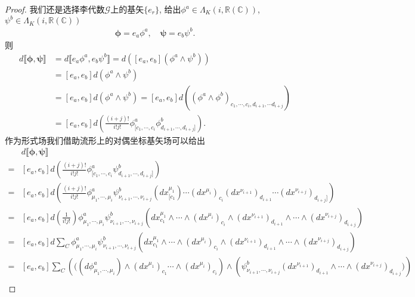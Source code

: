 \documentclass[../main.tex]{subfiles}
\begin{document}
\begin{proof}
  我们还是选择李代数$\mathscr{G}$上的基矢$\{e_r\}$, 给出$\phi^a \in \Lambda_K(i,\mathbb{R}(\mathbb{C}))$,$\psi^b \in \Lambda_K(i,\mathbb{R}(\mathbb{C}) )$
  \begin{align*}
    \bm{\phi} = e_a \phi^a ,\quad \bm{\psi} = e_b \psi^b 
  .\end{align*}
  则
  \begin{align*}
    d \llbracket \bm{\phi} ,\bm{\psi}  \rrbracket &= d \llbracket e_a \phi^a,e_b \psi^b \rrbracket = d([e_a,e_b](\phi^a \wedge \psi^b)) \\
                                                  & = [e_a,e_b] d(\phi^a \wedge \psi^b)\\
                                                  & = [e_a,e_b] d(\phi^a \wedge \psi^b) = [e_a,e_b]d((\phi^a \wedge \phi^b)_{c_1,\cdots,c_i,d_{i+1},\cdots d_{i+j}})\\
                                                  & = [e_a,e_b] d( \frac{(i+j)!}{i!j!}\phi^a_{[c_1,\cdots,c_i}\phi^b_{d_{i+1},\cdots,d_{i+j}]})
  .\end{align*}
  作为形式场我们借助流形上的对偶坐标基矢场可以给出
  \begin{align*}
    & d \llbracket \bm{\phi} ,\bm{\psi}  \rrbracket\\ =&  [e_a,e_b] d( \frac{(i+j)!}{i!j!}\phi^a_{[c_1,\cdots,c_i}\psi^b_{d_{i+1},\cdots,d_{i+j}]})\\
                                                  =&  [e_a,e_b] d( \frac{(i+j)!}{i!j!}\phi^a_{\mu_1,\cdots,\mu_i}\psi^b_{\nu_{i+1},\cdots,\nu_{i+j}}(dx^{\mu_1}_{[c_1})\cdots (dx^{\mu_i})_{c_i}(dx^{\nu_{i+1}})_{d_{i+1}}\cdots(dx^{\nu_{i+j}})_{d_{i+j}]})\\
                                                  =& [e_a,e_b] d(\frac{1}{i!j!})\phi^a_{\mu_1,\cdots,\mu_i}\psi^b_{\nu_{i+1},\cdots,\nu_{i+j}} (dx^{\mu_1}_{c_1} \wedge \cdots \wedge (dx^{\mu_i})_{c_i}\wedge(dx^{\nu_{i+1}})_{d_{i+1}}\wedge\cdots\wedge(dx^{\nu_{i+j}})_{d_{i+j}})\\
                                                  =& [e_a,e_b] d\sum_{C}\phi^a_{\mu_1,\cdots,\mu_i}\psi^b_{\nu_{i+1},\cdots,\nu_{i+j}} (dx^{\mu_1}_{c_1} \wedge \cdots \wedge (dx^{\mu_i})_{c_i}\wedge(dx^{\nu_{i+1}})_{d_{i+1}}\wedge\cdots\wedge(dx^{\nu_{i+j}})_{d_{i+j}})\\
                                                  = & [e_a,e_b]\sum_{C}\left(((d\phi^a_{\mu_1,\cdots,\mu_i})\wedge(dx^{\mu_1})_{c_1}\cdots\wedge(dx^{\mu_i})_{c_i}\right)\wedge\left(\psi^b_{\nu_{i+1},\cdots,\nu_{i+j}}(dx^{\nu_{i+1}})_{d_{i+1}}\wedge\cdots\wedge(dx^{\nu_{i+j}})_{d_{i+j}})\right)\\ 

\end{align*}
\end{proof}
\end{document}
